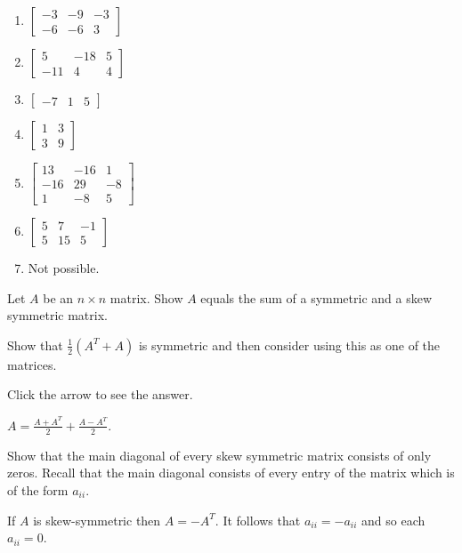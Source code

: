 \documentclass{ximera}
\begin{document}
\begin{problem}
\begin{hint}
\begin{enumerate}
\item $\left[
\begin{array}{rrr}
-3 & -9 & -3 \\
-6 & -6 & 3
\end{array}
\right]$
\item $\left[
\begin{array}{rrr}
5 & -18 & 5 \\
-11 & 4 & 4
\end{array}
\right]$
\item $\left[
\begin{array}{rrr}
-7 & 1 & 5
\end{array}
\right]$
\item $\left[
\begin{array}{rr}
1 & 3 \\
3 & 9
\end{array}
\right]$
\item $\left[ \begin{array}{rrr}
13 & -16 & 1\\
-16 & 29 & -8 \\
1 & -8 & 5
\end{array}
\right]$
\item $\left[ \begin{array}{rrr}
5 & 7 & -1 \\
5 & 15 & 5
\end{array}
\right]$
\item Not possible.
\end{enumerate}
\end{hint}
\end{problem}

\begin{problem}\label{prb:4.28} Let $A$ be an $n\times n$ matrix. Show $A$ equals the sum of a
symmetric and a skew symmetric matrix.

\begin{hint}
Show that $\frac{1}{2}\left( A^{T}+A\right) $ is symmetric and then consider using this
as one of the matrices.

Click the arrow to see the answer.
\begin{expandable}
$A=\frac{A+A^{T}}{2}+\frac{A-A^{T}}{2}.$
\end{expandable}
\end{hint}
\end{problem}

\begin{problem}\label{prb:4.29} Show that the main diagonal of every skew symmetric matrix consists of only zeros. Recall that the main diagonal consists of every entry of the matrix which is of the form
$a_{ii}$.
\begin{hint}
If $A$ is skew-symmetric then $A=-A^{T}.$ It follows that $a_{ii}=-a_{ii}$ and so each $a_{ii}=0$.
\end{hint}
\end{problem}
\end{document}
